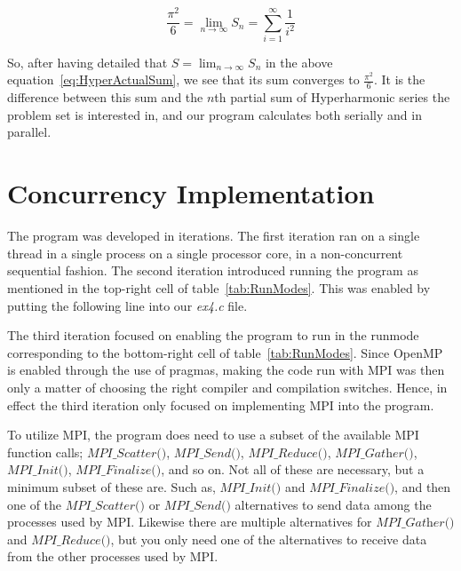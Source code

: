 \documentclass[fontsize=11pt,paper=a4,titlepage]{report}
\begin{document}
\begin{equation}
	\frac{\pi^2}{6} = \lim_{n \to \infty}S_n = \sum_{i=1}^{\infty} \frac{1}{i^2}
	\label{eq:HyperActualSum}
\end{equation}

So, after having detailed that $S = \lim_{n \to \infty}S_n$ in the above
equation~\ref{eq:HyperActualSum}, we see that its sum converges to $\frac{\pi^2}{6}$. 
It is the difference between this sum and the $n$th partial sum of Hyperharmonic 
series the problem set is interested in, and our program calculates both serially 
and in parallel.

\section{Concurrency Implementation}

The program was developed in iterations. The first iteration ran on a single
thread in a single process on a single processor core, in a non-concurrent
sequential fashion. The second iteration introduced running the program as
mentioned in the top-right cell of table~\ref{tab:RunModes}. This was enabled by
putting the following line into our \textit{ex4.c} file.



The third iteration focused on enabling the program to run in the runmode
corresponding to the bottom-right cell of table~\ref{tab:RunModes}.
Since OpenMP is enabled through the use of pragmas, making the code run with MPI
was then only a matter of choosing the right compiler and compilation switches.
Hence, in effect the third iteration only focused on implementing MPI into the
program.

To utilize MPI, the program does need to use a subset of the available MPI
function calls; $\textit{MPI\_Scatter()}$, $\textit{MPI\_Send()}$,
$\textit{MPI\_Reduce()}$, $\textit{MPI\_Gather()}$, $\textit{MPI\_Init()}$,
$\textit{MPI\_Finalize()}$, and so on. Not all of these are necessary, but a
minimum subset of these are. Such as, $\textit{MPI\_Init()}$ and $\textit{
MPI\_Finalize()}$, and then one of the $\textit{MPI\_Scatter()}$ or
$\textit{MPI\_Send()}$ alternatives to send data among the processes used by
MPI. Likewise there are multiple alternatives for $\textit{MPI\_Gather()}$ and
$\textit{MPI\_Reduce()}$, but you only need one of the alternatives to receive
data from the other processes used by MPI.
\end{document}
